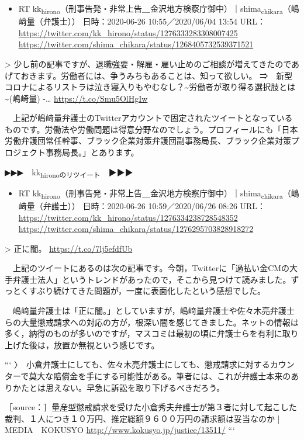 \documentclass[]{ltjarticle}
\begin{document}
\begin{itemize}
\item RT kk\textsubscript{hirono}（刑事告発・非常上告＿金沢地方検察庁御中）｜shima\textsubscript{chikara}（嶋﨑量（弁護士）） 日時：2020-06-26 10:55／2020/06/04 13:54 URL： \url{https://twitter.com/kk\_hirono/status/1276333283308007425} \url{https://twitter.com/shima\_chikara/status/1268405732539371521}
\end{itemize}

> 少し前の記事ですが、退職強要・解雇・雇い止めのご相談が増えてきたのであげておきます。労働者には、争うみちもあることは、知って欲しい。 ⇒　新型コロナによるリストラは泣き寝入りもやむなし？\textasciitilde{}労働者が取り得る選択肢とは\textasciitilde{}(嶋崎量) -… \url{https://t.co/Smu5OlHgIw}  

　上記が嶋﨑量弁護士のTwitterアカウントで固定されたツイートとなっているものです。労働法や労働問題は得意分野なのでしょう。プロフィールにも「日本労働弁護団常任幹事、ブラック企業対策弁護団副事務局長、ブラック企業対策プロジェクト事務局長。」とあります。

▶▶▶　kk\textsubscript{hironoのリツイート}　▶▶▶  

\begin{itemize}
\item RT kk\textsubscript{hirono}（刑事告発・非常上告＿金沢地方検察庁御中）｜shima\textsubscript{chikara}（嶋﨑量（弁護士）） 日時：2020-06-26 10:59／2020/06/26 08:26 URL： \url{https://twitter.com/kk\_hirono/status/1276334238728548352} \url{https://twitter.com/shima\_chikara/status/1276295703828918272}
\end{itemize}

> 正に闇。 \url{https://t.co/7lj5efdfUb}  

　上記のツイートにあるのは次の記事です。今朝，Twitterに「過払い金CMの大手弁護士法人」というトレンドがあったので，そこから見つけて読みました。ずっとくすぶり続けてきた問題が，一度に表面化したという感想でした。

　嶋﨑量弁護士は「正に闇。」としていますが，嶋﨑量弁護士や佐々木亮弁護士らの大量懲戒請求への対応の方が，根深い闇を感じてきました。ネットの情報は多く，納得のものが多いのですが，マスコミは最初の頃に弁護士らを有利に取り上げた後は，放置か無視という感じです。

```
〉　小倉弁護士にしても、佐々木亮弁護士にしても、懲戒請求に対するカウンターで莫大な賠償金を手にする可能性がある。筆者には、これが弁護士本来のありかたとは思えない。早急に訴訟を取り下げるべきだろう。

［source：］量産型懲戒請求を受けた小倉秀夫弁護士が第３者に対して起こした裁判、１人につき１０万円、推定総額９６００万円の請求額は妥当なのか | MEDIA　KOKUSYO \url{http://www.kokusyo.jp/justice/13511/}
```
\end{document}
